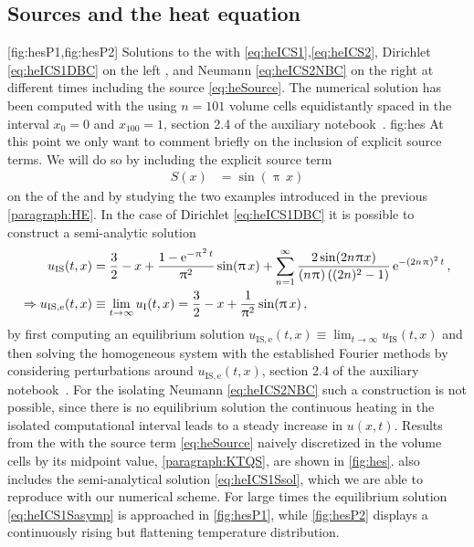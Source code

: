 \subsection{Sources and the heat equation}\label{subsec:hydroSource}
	[fig:hesP1,fig:hesP2]%
	{%
	Solutions to the \heq{} with \ics{} \eqref{eq:heICS1},\eqref{eq:heICS2}, Dirichlet \bc{} \eqref{eq:heICS1DBC} on the left , and  Neumann \bc{} \eqref{eq:heICS2NBC} on the right  at different times including the source \eqref{eq:heSource}.
	The numerical solution has been computed with the \ktScheme{} using $n=101$ volume cells equidistantly spaced in the interval $x_0=0$ and $x_{100}=1$, \cf{} section 2.4 of the auxiliary notebook~\cite{Steil:2023PhDFVNB}.
	}%
	{fig:hes}%
At this point we only want to comment briefly on the inclusion of explicit source terms.
We will do so by including the explicit source term
\begin{align}
	S(x)&=\sin(\uppi\, x)
	\label{eq:heSource}
\end{align}
on the \rhs{} of the \heq{} and by studying the two examples introduced in the previous \cref{paragraph:HE}.
In the case of Dirichlet \bc{} \eqref{eq:heICS1DBC} it is possible to construct a semi-analytic solution
\begin{subequations}\label{eq:heICS1S}
\begin{align}
	u_\mathrm{IS}(t,x)&= \frac{3}{2} - x+\frac{1-\mathrm{e}^{- \mkern1.0mu\uppi\mkern1.0mu^2 \, t}}{\uppi ^2}\sin (\uppi\,x) + \sum_{n = 1}^{\infty} \frac{2 \sin ( 2 n \mkern1.0mu\uppi\mkern1.0mu  x )}{( n \mkern1.0mu\uppi\mkern1.0mu ) \, ( (2 n )^2 - 1)} \, \mathrm{e}^{-( 2 n \mkern1.0mu\uppi\mkern1.0mu )^2 \, t}\label{eq:heICS1Ssol}\,,\\
	\Rightarrow u_{\mathrm{IS},\mathrm{e}}(t,x)&\equiv\lim_{t\rightarrow\infty}u_\mathrm{I}(t,x)=\frac{3}{2} - x+\frac{1}{\uppi ^2}\sin (\uppi\,x)\label{eq:heICS1Sasymp}\,,
\end{align}
\end{subequations}
by first computing an equilibrium solution $u_{\mathrm{IS},\mathrm{e}}(t,x)\equiv\lim_{t\rightarrow\infty}u_\mathrm{IS}(t,x)$ and then solving the homogeneous system with the established Fourier methods by considering perturbations around $u_{\mathrm{IS},\mathrm{e}}(t,x)$, \cf{} section 2.4 of the auxiliary notebook~\cite{Steil:2023PhDFVNB}.
For the isolating Neumann \bc{} \eqref{eq:heICS2NBC} such a construction is not possible, since there is no equilibrium solution \dash{} the continuous heating in the isolated computational interval leads to a steady increase in $u(x,t)$.
Results from the \ktScheme{} with the source term \eqref{eq:heSource} naively discretized in the volume cells by its midpoint value, \cf{} \cref{paragraph:KTQS}, are shown in \cref{fig:hes}.
 also includes the semi-analytical solution \eqref{eq:heICS1Ssol}, which we are able to reproduce with our numerical scheme.
For large times the equilibrium solution \eqref{eq:heICS1Sasymp} is approached in \cref{fig:hesP1}, while \cref{fig:hesP2} displays a continuously rising but flattening temperature distribution.


